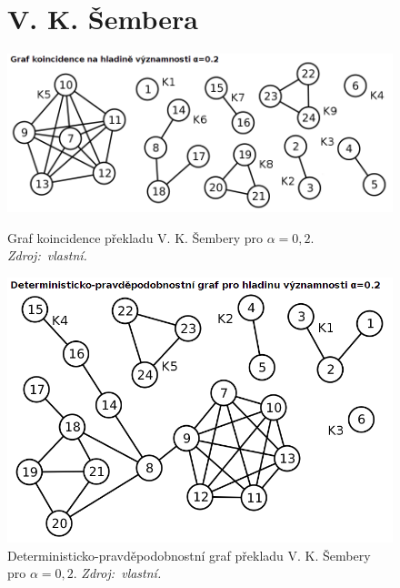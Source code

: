 \documentclass[dp.tex]{subfiles}
\begin{document}
\begin{figure}[h]
\section*{V. K. Šembera}
	\centering
	\includegraphics[max width=\textwidth,keepaspectratio=true]{imgs-99-priloha-d/a_k_20}
	\caption[Graf koincidence překladu V. K. Šembery pro $\alpha = 0{,}2$]
            {Graf koincidence překladu V. K. Šembery pro $\alpha = 0{,}2$. \textit{Zdroj:~vlastní.}}
	\label{fig:a_k_20}

	\vspace*{1.5cm}

	\includegraphics[max width=\textwidth,keepaspectratio=true]{imgs-99-priloha-d/a_d_20}
	\caption[Deterministicko-pravděpodobnostní graf překladu V. K. Šembery pro $\alpha = 0{,}2$]
            {Deterministicko-pravděpodobnostní graf překladu V. K. Šembery pro $\alpha = 0{,}2$. \textit{Zdroj:~vlastní.}}
	\label{fig:a_d_20}
\end{figure}
\end{document}
